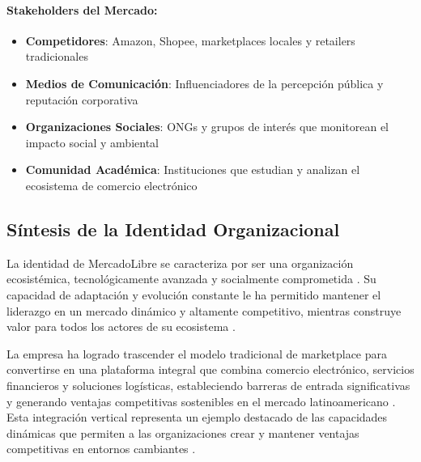 \paragraph{Stakeholders del Mercado:}
\begin{itemize}
\item \textbf{Competidores}: Amazon, Shopee, marketplaces locales y retailers tradicionales
\item \textbf{Medios de Comunicación}: Influenciadores de la percepción pública y reputación corporativa
\item \textbf{Organizaciones Sociales}: ONGs y grupos de interés que monitorean el impacto social y ambiental
\item \textbf{Comunidad Académica}: Instituciones que estudian y analizan el ecosistema de comercio electrónico
\end{itemize}

\subsection{Síntesis de la Identidad Organizacional}

La identidad de MercadoLibre se caracteriza por ser una organización ecosistémica, tecnológicamente avanzada y socialmente comprometida \autocite{mercadolibre2024}. Su capacidad de adaptación y evolución constante le ha permitido mantener el liderazgo en un mercado dinámico y altamente competitivo, mientras construye valor para todos los actores de su ecosistema \autocite{porter1985}.

La empresa ha logrado trascender el modelo tradicional de marketplace para convertirse en una plataforma integral que combina comercio electrónico, servicios financieros y soluciones logísticas, estableciendo barreras de entrada significativas y generando ventajas competitivas sostenibles en el mercado latinoamericano \autocite{barney1991}. Esta integración vertical representa un ejemplo destacado de las capacidades dinámicas que permiten a las organizaciones crear y mantener ventajas competitivas en entornos cambiantes \autocite{teece2007}.
